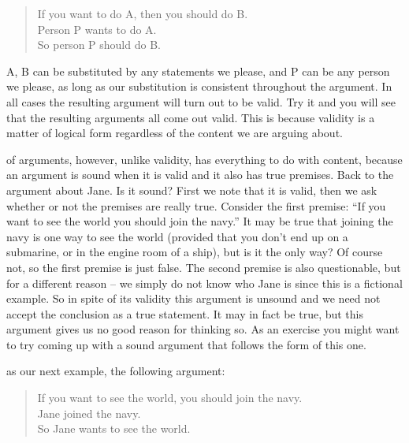 \documentclass[justified]{tufte-book}
\newenvironment{argument}{\begin{quote}\normalsize}{\end{quote}}
\begin{document}
\begin{argument}
If you want to do A, then you should do B.\\
Person P wants to do A.\\

So person P should do B.
\end{argument}

 A, B can be substituted by any statements we please, and P can be any person we please, as long as our substitution is consistent throughout the argument. In all cases the resulting argument will turn out to be valid. Try it and you will see that the resulting arguments all come out valid. This is because validity is a matter of logical form regardless of the content we are arguing about.

 of arguments, however, unlike validity, has everything to do with content, because an argument is sound when it is valid and it also has true premises. Back to the argument about Jane. Is it sound? First we note that it is valid, then we ask whether or not the premises are really true. Consider the first premise: ``If you want to see the world you should join the navy.'' It may be true that joining the navy is one way to see the world (provided that you don't end up on a submarine, or in the engine room of a ship), but is it the only way? Of course not, so the first premise is just false. The second premise is also questionable, but for a different reason -- we simply do not know who Jane is since this is a fictional example. So in spite of its validity this argument is unsound and we need not accept the conclusion as a true statement. It may in fact be true, but this argument gives us no good reason for thinking so. As an exercise you might want to try coming up with a sound argument that follows the form of this one.

 as our next example, the following argument:

\begin{argument}
If you want to see the world, you should join the navy.\\
Jane joined the navy.\\

So Jane wants to see the world.
\end{argument}
\end{document}
